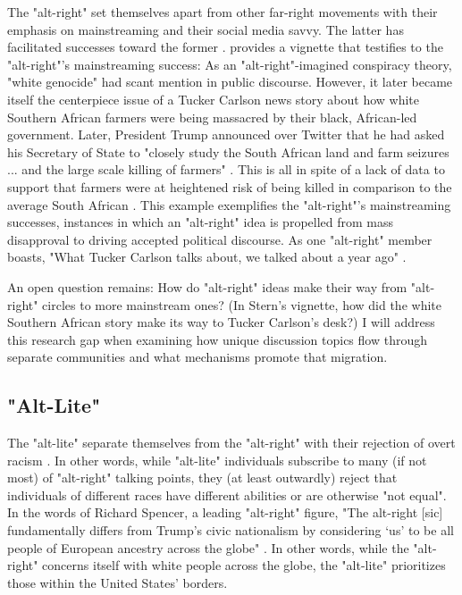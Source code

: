 \documentclass[acmlarge, screen, authorversion]{acmart}
\begin{document}
The "alt-right" set themselves apart from other far-right movements with their emphasis on mainstreaming and their social media savvy. The latter has facilitated successes toward the former \cite{sternProudBoysWhite2019, nagleKillAllNormies2017, gallaherMainstreamingWhiteSupremacy2020}. 
\citet{sternProudBoysWhite2019} provides a vignette that testifies to the "alt-right"'s mainstreaming success: As an "alt-right"-imagined conspiracy theory, "white genocide" had scant mention in public discourse. However, it later became itself the centerpiece issue of a Tucker Carlson news story about how white Southern African farmers were being massacred by their black, African-led government. Later, President Trump announced over Twitter that he had asked his Secretary of State to "closely study the South African land and farm seizures ... and the large scale killing of farmers" \cite{colindwyerHereStoryThat2018}. This is all in spite of a lack of data to support that farmers were at heightened risk of being killed in comparison to the average South African \cite{SARejectsTrump2018}. This example exemplifies the "alt-right"'s mainstreaming successes, instances in which an "alt-right" idea is propelled from mass disapproval to driving accepted political discourse. As one "alt-right" member boasts, "What Tucker Carlson talks about, we talked about a year ago" \cite{janetreitmanLawEnforcementFailed2018}. 

An open question remains: How do "alt-right" ideas make their way from "alt-right" circles to more mainstream ones? (In Stern's vignette, how did the white Southern African story make its way to Tucker Carlson's desk?) I will address this research gap when examining how unique discussion topics flow through separate communities and what mechanisms promote that migration. 

\subsection{"Alt-Lite"}

The "alt-lite" separate themselves from the "alt-right" with their
rejection of overt racism \cite{anti-defamationleagueAltRightAlt, mainRiseAltRight2018, hawleyMakingSenseAltright2017}. In other words, while "alt-lite" individuals subscribe
to many (if not most) of "alt-right" talking points, they (at least
outwardly) reject that individuals of different races have different
abilities or are otherwise "not equal". In the words of Richard
Spencer, a leading "alt-right" figure, "The alt-right [sic] fundamentally
differs from Trump’s civic nationalism by considering ‘us’ to be all
people of European ancestry across the globe" \cite{anti-defamationleagueAltRightAlt, mainRiseAltRight2018}. In other words, while the "alt-right" concerns
itself with white people across the globe, the "alt-lite" prioritizes
those within the United States’ borders.
\end{document}
